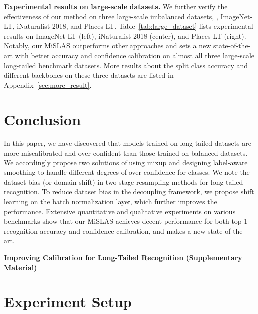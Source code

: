 \documentclass[final]{cvpr}
\begin{document}
	\vspace{6pt}
	\noindent\textbf{Experimental results on large-scale datasets.} 
	\quad We further verify the effectiveness of our method on three large-scale imbalanced datasets, \ie, ImageNet-LT, iNaturalist 2018, and Places-LT. Table~\ref{tab:large_dataset} lists experimental results on ImageNet-LT (left), iNaturalist 2018 (center), and Places-LT (right). Notably, our MiSLAS outperforms other approaches and sets a new state-of-the-art with better accuracy and confidence calibration on almost all three large-scale long-tailed benchmark datasets. More results about the split class accuracy and different backbones on these three datasets are listed in Appendix~\ref{sec:more_result}.
	

	\section{Conclusion}
	
	\vspace{1pt}
	
	In this paper, we have discovered that models trained on long-tailed datasets are more miscalibrated and over-confident than those trained on balanced datasets. We accordingly propose two solutions of using mixup and designing label-aware smoothing to handle different degrees of over-confidence for classes. We note the dataset bias (or domain shift) in two-stage resampling methods for long-tailed recognition. To reduce dataset bias in the decoupling framework, we propose shift learning on the batch normalization layer, which further improves the performance. Extensive quantitative and qualitative experiments on various benchmarks show that our MiSLAS achieves decent performance for both top-1 recognition accuracy and confidence calibration, and makes a new state-of-the-art.
	
	\clearpage
	{   
		\small
		
		
	}
	\clearpage
	
	


	\appendix
	\onecolumn
	\begin{center}
		\Large \textbf{Improving Calibration for Long-Tailed Recognition (Supplementary Material)}
	\end{center}
	\section{Experiment Setup}\label{sec:es}
	
	
	
\end{document}
